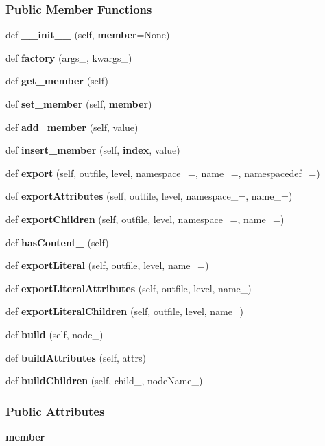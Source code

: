 \subsubsection*{Public Member Functions}
\begin{DoxyCompactItemize}
\item 
def {\bf \+\_\+\+\_\+init\+\_\+\+\_\+} (self, {\bf member}=None)
\item 
def {\bf factory} (args\+\_\+, kwargs\+\_\+)
\item 
def {\bf get\+\_\+member} (self)
\item 
def {\bf set\+\_\+member} (self, {\bf member})
\item 
def {\bf add\+\_\+member} (self, value)
\item 
def {\bf insert\+\_\+member} (self, {\bf index}, value)
\item 
def {\bf export} (self, outfile, level, namespace\+\_\+=\textquotesingle{}\textquotesingle{}, name\+\_\+=\textquotesingle{}, namespacedef\+\_\+=\textquotesingle{}\textquotesingle{})
\item 
def {\bf export\+Attributes} (self, outfile, level, namespace\+\_\+=\textquotesingle{}\textquotesingle{}, name\+\_\+=\textquotesingle{})
\item 
def {\bf export\+Children} (self, outfile, level, namespace\+\_\+=\textquotesingle{}\textquotesingle{}, name\+\_\+=\textquotesingle{})
\item 
def {\bf has\+Content\+\_\+} (self)
\item 
def {\bf export\+Literal} (self, outfile, level, name\+\_\+=\textquotesingle{})
\item 
def {\bf export\+Literal\+Attributes} (self, outfile, level, name\+\_\+)
\item 
def {\bf export\+Literal\+Children} (self, outfile, level, name\+\_\+)
\item 
def {\bf build} (self, node\+\_\+)
\item 
def {\bf build\+Attributes} (self, attrs)
\item 
def {\bf build\+Children} (self, child\+\_\+, node\+Name\+\_\+)
\end{DoxyCompactItemize}
\subsubsection*{Public Attributes}
\begin{DoxyCompactItemize}
\item 
{\bf member}
\end{DoxyCompactItemize}
